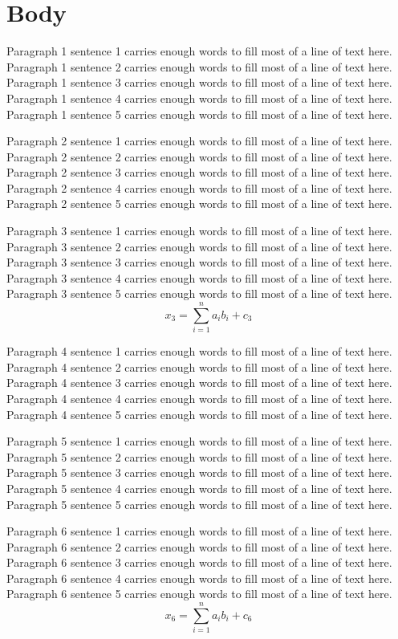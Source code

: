 \section{Body}

Paragraph 1 sentence 1 carries enough words to fill most of a line of text here.
Paragraph 1 sentence 2 carries enough words to fill most of a line of text here.
Paragraph 1 sentence 3 carries enough words to fill most of a line of text here.
Paragraph 1 sentence 4 carries enough words to fill most of a line of text here.
Paragraph 1 sentence 5 carries enough words to fill most of a line of text here.

Paragraph 2 sentence 1 carries enough words to fill most of a line of text here.
Paragraph 2 sentence 2 carries enough words to fill most of a line of text here.
Paragraph 2 sentence 3 carries enough words to fill most of a line of text here.
Paragraph 2 sentence 4 carries enough words to fill most of a line of text here.
Paragraph 2 sentence 5 carries enough words to fill most of a line of text here.

Paragraph 3 sentence 1 carries enough words to fill most of a line of text here.
Paragraph 3 sentence 2 carries enough words to fill most of a line of text here.
Paragraph 3 sentence 3 carries enough words to fill most of a line of text here.
Paragraph 3 sentence 4 carries enough words to fill most of a line of text here.
Paragraph 3 sentence 5 carries enough words to fill most of a line of text here.
\begin{equation}
  x_3 = \sum_{i=1}^{n} a_i b_i + c_3
\end{equation}

Paragraph 4 sentence 1 carries enough words to fill most of a line of text here.
Paragraph 4 sentence 2 carries enough words to fill most of a line of text here.
Paragraph 4 sentence 3 carries enough words to fill most of a line of text here.
Paragraph 4 sentence 4 carries enough words to fill most of a line of text here.
Paragraph 4 sentence 5 carries enough words to fill most of a line of text here.

Paragraph 5 sentence 1 carries enough words to fill most of a line of text here.
Paragraph 5 sentence 2 carries enough words to fill most of a line of text here.
Paragraph 5 sentence 3 carries enough words to fill most of a line of text here.
Paragraph 5 sentence 4 carries enough words to fill most of a line of text here.
Paragraph 5 sentence 5 carries enough words to fill most of a line of text here.

Paragraph 6 sentence 1 carries enough words to fill most of a line of text here.
Paragraph 6 sentence 2 carries enough words to fill most of a line of text here.
Paragraph 6 sentence 3 carries enough words to fill most of a line of text here.
Paragraph 6 sentence 4 carries enough words to fill most of a line of text here.
Paragraph 6 sentence 5 carries enough words to fill most of a line of text here.
\begin{equation}
  x_6 = \sum_{i=1}^{n} a_i b_i + c_6
\end{equation}

